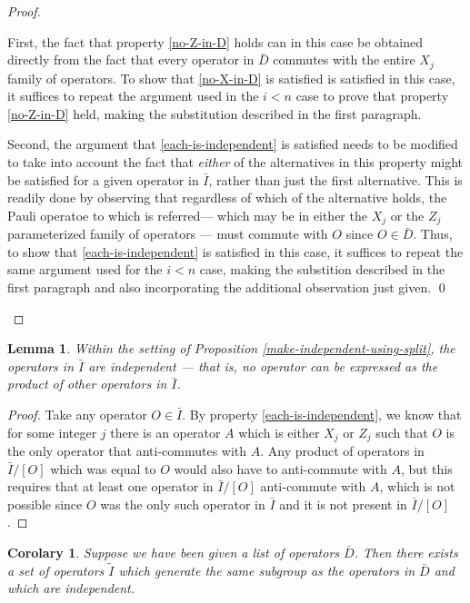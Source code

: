\documentclass[twocolumn,showpacs,preprintnumbers,amsmath,amssymb,nofootinbib,pra,floatfix]{revtex4}
\newtheorem{lemma}{Lemma}
\newtheorem{corolary}{Corolary}
\begin{document}
\begin{proof}
\begin{description}
First, the fact that property \ref{no-Z-in-D} holds can in this case be obtained directly from the fact that every operator in $\bar D$ commutes with the entire $X_j$ family of operators.  To show that \ref{no-X-in-D} is satisfied is satisfied in this case, it suffices to repeat the argument used in the $i<n$ case to prove that property \ref{no-Z-in-D} held, making the substitution described in the first paragraph.

Second, the argument that \ref{each-is-independent} is satisfied needs to be modified to take into account the fact that \emph{either} of the alternatives in this property might be satisfied for a given operator in $\bar I$, rather than just the first alternative.  This is readily done by observing that regardless of which of the alternative holds, the Pauli operatoe to which is referred--- which may be in either the $X_j$ or the $Z_j$ parameterized family of operators --- must commute with $O$ since $O\in\bar D$.  Thus, to show that \ref{each-is-independent} is satisfied in this case, it suffices to repeat the same argument used for the $i<n$ case, making the substition described in the first paragraph and also incorporating the additional observation just given. \qed
\end{description}
\end{proof}

\begin{lemma}
\label{resulting-operators-are-independent}
Within the setting of Proposition \ref{make-independent-using-split}, the operators in $\bar I$ are independent --- that is, no operator can be expressed as the product of other operators in $\bar I$.
\end{lemma}

\begin{proof}
Take any operator $O\in\bar I$.  By property \ref{each-is-independent}, we know that for some integer $j$ there is an operator $A$ which is either $X_j$ or $Z_j$ such that $O$ is the only operator that anti-commutes with $A$.  Any product of operators in $\bar I\slash [O]$ which was equal to $O$ would also have to anti-commute with $A$, but this requires that at least one operator in $\bar I\slash [O]$ anti-commute with $A$, which is not possible since $O$ was the only such operator in $\bar I$ and it is not present in $\bar I\slash [O]$.
\end{proof}

\begin{corolary}
\label{corolary-make-independent-using-split}
Suppose we have been given a list of operators $\bar D$.  Then there exists a set of operators $\tilde I$ which generate the same subgroup as the operators in $\bar D$ and which are independent.
\end{corolary}
\end{document}
